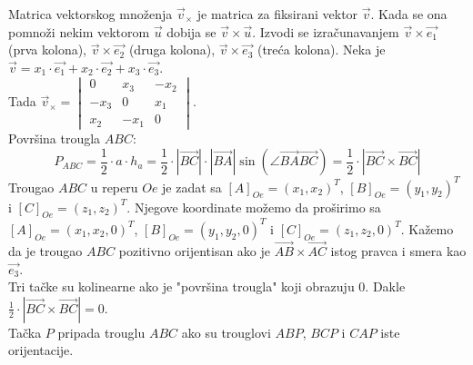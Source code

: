 \documentclass[12pt]{article}
\newcommand{\vek}[1]{\overrightarrow{#1}}
\begin{document}
    Matrica vektorskog množenja $\vek{v}_\times$ je matrica za fiksirani vektor $\vek{v}$.
    Kada se ona pomnoži nekim vektorom $\vek{u}$ dobija se $\vek{v}\times\vek{u}$.
    Izvodi se izračunavanjem $\vek{v}\times\vek{e_1}$ (prva kolona), $\vek{v}\times\vek{e_2}$ (druga kolona), $\vek{v}\times\vek{e_3}$ (treća kolona).
    Neka je $\vek{v}=x_1\cdot\vek{e_1}+x_2\cdot\vek{e_2}+x_3\cdot\vek{e_3}$.\\
    Tada  $\vek{v}_\times= \begin{vmatrix}
    0    & x_3  & -x_2 \\
    -x_3 & 0    & x_1  \\
    x_2  & -x_1 & 0
\end{vmatrix}$.\\
    Površina trougla $ABC$:
    $$P_{ABC}=\frac{1}{2}\cdot a\cdot h_a=\frac{1}{2}\cdot |\vek{BC}|\cdot|\vek{BA}|\sin(\angle\vek{BA}\vek{BC})=\frac{1}{2}\cdot |\vek{BC}\times\vek{BC}|$$
    Trougao $ABC$ u reperu $Oe$ je zadat sa $[A]_{Oe}=(x_1,x_2)^T$, $[B]_{Oe}=(y_1,y_2)^T$ i $[C]_{Oe}=(z_1,z_2)^T$.
    Njegove koordinate možemo da proširimo sa $[A]_{Oe}=(x_1,x_2,0)^T$, $[B]_{Oe}=(y_1,y_2,0)^T$ i $[C]_{Oe}=(z_1,z_2,0)^T$.
    Kažemo da je trougao $ABC$ pozitivno orijentisan ako je
$\vek{AB}\times\vek{AC}$ istog pravca i smera kao $\vek{e_3}$.\\
    Tri tačke su kolinearne ako je "površina trougla" koji obrazuju 0.
    Dakle $\frac{1}{2}\cdot |\vek{BC}\times\vek{BC}|=0$.\\
    Tačka $P$ pripada trouglu $ABC$ ako su trouglovi $ABP$, $BCP$ i $CAP$ iste orijentacije.
    \par
\end{document}
